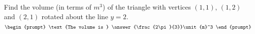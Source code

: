 \documentclass{ximera}
\author{Gregory Hartman \and Matthew Carr}
\begin{document}
\begin{exercise}






Find the volume (in terms of $\unit{m}^3$) of the triangle with vertices $(1,1)$, $(1,2)$ and $(2,1)$ rotated about the line $y=2$.
\[
\begin{prompt}
\text{The volume is } \answer{\frac{2\pi}{3}}\unit{m}^3
\end{prompt}
\]




\end{exercise}
\end{document}
